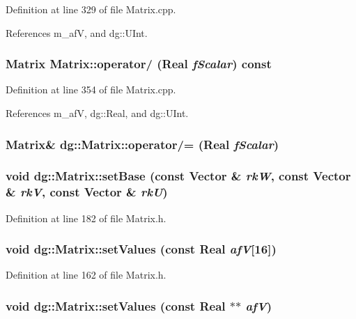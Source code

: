 Definition at line 329 of file Matrix.cpp.

References m\_\-af\-V, and dg::UInt.
\subsubsection{\setlength{\rightskip}{0pt plus 5cm}Matrix Matrix::operator/ ({\bf Real} {\em f\-Scalar}) const}\label{classdg_1_1Matrix_a19}




Definition at line 354 of file Matrix.cpp.

References m\_\-af\-V, dg::Real, and dg::UInt.
\subsubsection{\setlength{\rightskip}{0pt plus 5cm}Matrix\& dg::Matrix::operator/= ({\bf Real} {\em f\-Scalar})}\label{classdg_1_1Matrix_a25}


\subsubsection{\setlength{\rightskip}{0pt plus 5cm}void dg::Matrix::set\-Base (const {\bf Vector} \& {\em rk\-W}, const {\bf Vector} \& {\em rk\-V}, const {\bf Vector} \& {\em rk\-U})\hspace{0.3cm}{\tt  [inline]}}\label{classdg_1_1Matrix_a10}




Definition at line 182 of file Matrix.h.
\subsubsection{\setlength{\rightskip}{0pt plus 5cm}void dg::Matrix::set\-Values (const {\bf Real} {\em af\-V}[16])\hspace{0.3cm}{\tt  [inline]}}\label{classdg_1_1Matrix_a9}




Definition at line 162 of file Matrix.h.
\subsubsection{\setlength{\rightskip}{0pt plus 5cm}void dg::Matrix::set\-Values (const {\bf Real} $\ast$$\ast$ {\em af\-V})\hspace{0.3cm}{\tt  [inline]}}\label{classdg_1_1Matrix_a8}




